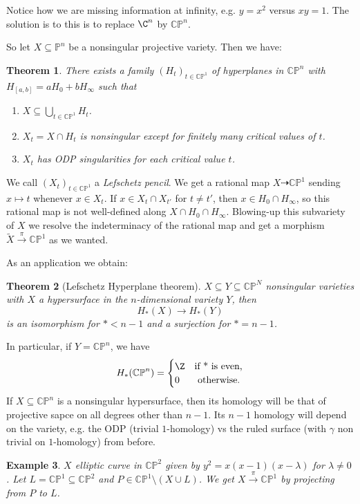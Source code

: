 \documentclass[A4paper, british]{amsart}
\theoremstyle{darkgreentheorem}
\newtheorem{thm}{Theorem}[section]
\theoremstyle{darkbluedefinition}
\theoremstyle{darkredexample}
\newtheorem{exa}[thm]{Example}
\theoremstyle{remark}
\newcommand{\CP}{\mathbb{CP}}
\newcommand{\1}{\mathbbm{1}}
\begin{document}
Notice how we are missing information at infinity, e.g. $y=x^{2}$ versus $xy=1$.
The solution is to this is to replace $\C^{n}$ by $\CP^{n}$.

So let $X\subseteq\mathbb{P}^{n}$ be a nonsingular projective variety.
Then we have:

\begin{thm}
    There exists a family $(H_{t})_{t\in \CP^{1}}$ of hyperplanes in $\CP^{n}$ with $H_{[a,b]}=aH_{0}+bH_{\infty}$ such that
    \begin{enumerate}
	\item $X\subseteq \bigcup_{t\in \CP^{1}}H_{t}$.
	\item $X_{t}=X\cap H_{t}$ is nonsingular except for finitely many critical values of $t$.
	\item $X_{t}$ has ODP singularities for each critical value $t$.
    \end{enumerate}
\end{thm}

We call $(X_{t})_{t\in \CP^{1}}$ a \textit{Lefschetz pencil}.
We get a rational map $X\dashrightarrow \CP^{1}$ sending $x\mapsto t$ whenever $x\in X_{t}$.
If $x\in X_{t}\cap X_{t'}$ for $t\neq t'$, then $x\in H_{0}\cap H_{\infty}$, so this rational map is not well-defined along $X\cap H_{0}\cap H_{\infty}$.
Blowing-up this subvariety of $X$ we resolve the indeterminacy of the rational map and get a morphism $\tilde{X}\xrightarrow{\pi} \CP^{1}$ as we wanted.

As an application we obtain:

\begin{thm}[Lefschetz Hyperplane theorem]
    $X\subseteq Y\subseteq \CP^{N}$ nonsingular varieties with $X$ a hypersurface in the $n$-dimensional variety $Y$, then
    \[ H_{*}(X)\to H_{*}(Y) \]
    is an isomorphism for $*<n-1$ and a surjection for $*=n-1$.
\end{thm}

In particular, if $Y=\CP^{n}$, we have
\[ H_{*}(\CP^{n})=\begin{cases} \Z & \text{if } $*$ \text{ is even,} \\ 0 & \text{ otherwise.} \end{cases}\]
If $X\subseteq \CP^{n}$ is a nonsingular hypersurface, then its homology will be that of projective sapce on all degrees other than $n-1$.
Its $n-1$ homology will depend on the variety, e.g. the ODP (trivial $1$-homology) vs the ruled surface (with $\gamma$ non trivial on $1$-homology) from before.

\begin{exa}
    $X$ elliptic curve in $\CP^{2}$ given by $y^{2}=x(x-1)(x-\lambda)$ for $\lambda\neq 0$.
    Let $L=\CP^{1}\subseteq \CP^{2}$ and $P\in \CP^{1}\setminus (X\cup L)$.
    We get $X\xrightarrow{\pi}\CP^{1}$ by projecting from $P$ to $L$.
\end{exa}
\end{document}
